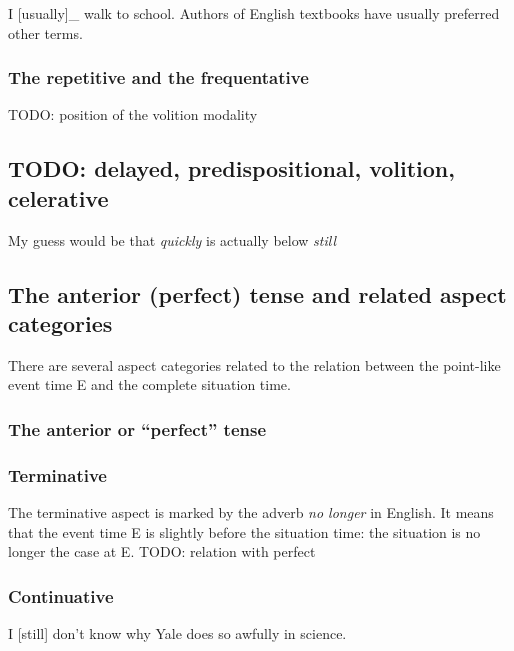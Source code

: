 \documentclass[UTF8, a4paper, oneside, scheme=plain, 12pt]{ctexbook}
\newcommand{\form}[1]{\emph{#1}}
\begin{document}
\begin{exe}
    \ex I [usually]_{} walk to school.
    \ex Authors of English textbooks have usually preferred other terms. 
\end{exe}

\subsubsection{The repetitive and the frequentative}

TODO: position of the volition modality 

\subsection{TODO: delayed, predispositional, volition, celerative}

My guess would be that \form{quickly} is actually below \form{still}

\subsection{The anterior (perfect) tense and related aspect categories}

There are several aspect categories related to the relation 
between the point-like event time E 
and the complete situation time.

\subsubsection{The anterior or ``perfect'' tense}\label{sec:vp.tam.anterior}

\subsubsection{Terminative}\label{sec:vp.tam.terminative}

The terminative aspect is marked by the adverb \form{no longer} in English.
It means that the event time E is slightly before the situation time:
the situation is no longer the case at E. 
TODO: relation with perfect 

\subsubsection{Continuative}\label{sec:vp.tam.continuative}

\begin{exe}
    \ex I [still] don't know why Yale does so awfully in science. 
\end{exe}
\end{document}
